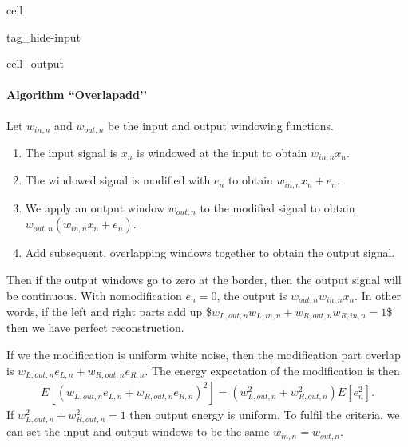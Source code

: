 \documentclass[letterpaper,10pt,english]{jupyterBook}
\begin{document}
\begin{sphinxuseclass}{cell}
\begin{sphinxuseclass}{tag_hide-input}\begin{sphinxVerbatimOutput}

\begin{sphinxuseclass}{cell_output}
\noindent{}

\end{sphinxuseclass}\end{sphinxVerbatimOutput}

\end{sphinxuseclass}
\end{sphinxuseclass}

\paragraph{Algorithm ``Overlap\sphinxhyphen{}add’’}
\label{\detokenize{Representations/Short-time_processing:algorithm-overlap-add}}
\sphinxAtStartPar
Let \(w_{in,n}\) and \(w_{out,n}\) be the input and output windowing functions.
\begin{enumerate}
%
\item {} 
\sphinxAtStartPar
The input signal is \(x_n\) is windowed at the input to obtain  \(w_{in,n}x_n\).

\item {} 
\sphinxAtStartPar
The windowed signal is modified with \(e_n\) to obtain \(w_{in,n}x_n+e_n\).

\item {} 
\sphinxAtStartPar
We apply an output window \(w_{out,n}\) to the modified signal to obtain \(w_{out,n}(w_{in,n}x_n+e_n)\).

\item {} 
\sphinxAtStartPar
Add subsequent, overlapping windows together to obtain the output signal.

\end{enumerate}

\sphinxAtStartPar
Then if the output windows go to zero at the border, then the output signal will be continuous.
With no\sphinxhyphen{}modification \(e_n=0\), the output is \(w_{out,n}w_{in,n}x_n\).
In other words, if the left and right parts add up \$\( w_{L,out,n}w_{L,in,n} + w_{R,out,n}w_{R,in,n} = 1 \)\$ then we have perfect reconstruction.

\sphinxAtStartPar
If we the modification is uniform white noise, then the  modification part overlap is \(w_{L,out,n}e_{L,n} + w_{R,out,n}e_{R,n}\).
The energy expectation of the modification is then
\begin{equation*}
\begin{split}  E\left[\left(w_{L,out,n}e_{L,n} + w_{R,out,n}e_{R,n}\right)^2\right]  = \left(w^2_{L,out,n} + w^2_{R,out,n}\right) E[e_n^2]. \end{split}
\end{equation*}
\sphinxAtStartPar
If \(w^2_{L,out,n} + w^2_{R,out,n}=1\) then output energy is uniform.
To fulfil the criteria, we can set the input and output    windows to be the same \(w_{in,n} = w_{out,n}\).
\end{document}
